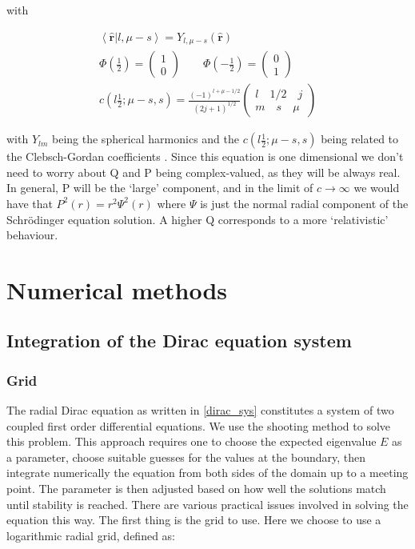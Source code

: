 \documentclass[]{report}
\begin{document}
with

\begin{align}
\left<\mathbf{\hat{r}}|l,\mu-s\right> = Y_{l,\mu-s}(\mathbf{\hat{r}}) \\
\Phi\left(\frac{1}{2}\right) = \begin{pmatrix}
1 \\
0
\end{pmatrix}
\qquad
\Phi\left(-\frac{1}{2}\right) = \begin{pmatrix}
0 \\
1
\end{pmatrix} \\
c(l\frac{1}{2};\mu-s, s) = \frac{(-1)^{l+\mu-1/2}}{(2j+1)^{1/2}}\begin{pmatrix}
l \quad 1/2 \quad j \\
m \quad s \quad \mu
\end{pmatrix}
\end{align}

with $Y_{lm}$ being the spherical harmonics and the $c(l\frac{1}{2};\mu-s, s)$ being related to the Clebsch-Gordan coefficients \cite{weinb2008}.\newline
Since this equation is one dimensional we don't need to worry about Q and P being complex-valued, as they will be always real. In general, P will be the `large' component, and in the limit of $c \rightarrow \infty$ we would have that $P^2(r) = r^2\Psi^2(r)$ where $\Psi$ is just the normal radial component of the Schr\"{o}dinger equation solution. A higher Q corresponds to a more `relativistic' behaviour.

\chapter{Numerical methods}

\section{Integration of the Dirac equation system}

\subsection{Grid}

The radial Dirac equation as written in \ref{dirac_sys} constitutes a system of two coupled first order differential equations. We use the shooting method to solve this problem. This approach requires one to choose the expected eigenvalue $E$ as a parameter, choose suitable guesses for the values at the boundary, then integrate numerically the equation from both sides of the domain up to a meeting point. The parameter is then adjusted based on how well the solutions match until stability is reached.\newline
There are various practical issues involved in solving the equation this way. The first thing is the grid to use. Here we choose to use a logarithmic radial grid, defined as:
\end{document}
